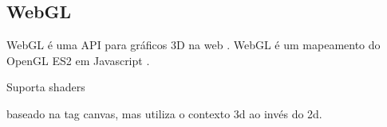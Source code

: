 
\subsection{WebGL}

WebGL é uma API para gráficos 3D na web \cite{lubbers2010pro}.
WebGL é um mapeamento do OpenGL ES2 em Javascript \cite{lubbers2010pro}.


Suporta shaders

baseado na tag canvas, mas utiliza o contexto 3d ao invés do 2d.
